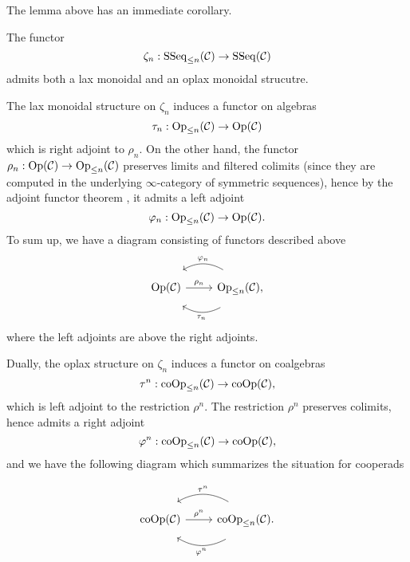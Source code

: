 The lemma above has an immediate corollary.
\begin{corollary}
\label{functors between operads adn their truncations}
    The functor 
    $$
    \zeta_n: \operatorname{SSeq}_{\leq n}({\mathcal{C}}) \to \operatorname{SSeq}({\mathcal{C}})
    $$
    admits both a lax monoidal and an oplax monoidal strucutre. 
\end{corollary}
    The lax monoidal structure on $\zeta_n$ induces a functor on algebras
    $$
    \tau_{n}:\operatorname{Op}_{\leq n}({\mathcal{C}})
    \to 
    \operatorname{Op}({\mathcal{C}})
    $$
    which is right adjoint to $\rho_{n}$. On the other hand, the functor $\rho_n:\operatorname{Op}({\mathcal{C}}) \to \operatorname{Op}_{\leq n}({\mathcal{C}})$ preserves limits and filtered colimits (since they are computed in the underlying $\infty$-category of symmetric sequences), hence by the adjoint functor theorem \cite[Corollary 5.5.2.9.]{HTT}, it admits a left adjoint 
    $$
    \varphi_n: \operatorname{Op}_{\leq n}({\mathcal{C}})
    \to 
    \operatorname{Op}({\mathcal{C}}).
    $$
    To sum up, we have a diagram consisting of functors described above
\begin{equation}
\label{Op-Op_n adjunction}
	\begin{tikzcd}
 \Opd(\CC) & \operatorname{Op}_{\leq n}(\CC),
	\arrow[from=1-2, to= 1-1, bend right, shift right = 3, "\varphi_n" above]
	\arrow[from=1-2, to=1-1, bend left, shift left = 3, "\tau_n" below]
	\arrow[from=1-1, to=1-2, "\rho_n"]
\end{tikzcd}
\end{equation}
where the left adjoints are above the right adjoints.
    

    
    Dually, the oplax structure on $\zeta_n$ induces a functor on coalgebras
    $$
    \tau^{n}:\operatorname{coOp}_{\leq n}({\mathcal{C}})
    \to 
    \operatorname{coOp}({\mathcal{C}}),
    $$
    which is left adjoint to the restriction $\rho^n$. The restriction $\rho^n$ preserves colimits, hence admits a right adjoint
    $$
    \varphi^{n}: \operatorname{coOp}_{\leq n}({\mathcal{C}})
    \to 
    \operatorname{coOp}({\mathcal{C}}),
    $$
    and we have the following diagram which summarizes the situation for cooperads
    
    \begin{equation}
\label{coOp-coOp_n adjunction}
	\begin{tikzcd}
\Coop(\CC) & \operatorname{coOp}_{\leq n}(\CC)
	\arrow[from=1-2, to= 1-1, bend right, shift right = 3, "\tau^n" above]
	\arrow[from=1-2, to=1-1, bend left, shift left = 3, "\varphi^n" below]
	\arrow[from=1-1, to=1-2, "\rho^n"].
\end{tikzcd}
\end{equation}


